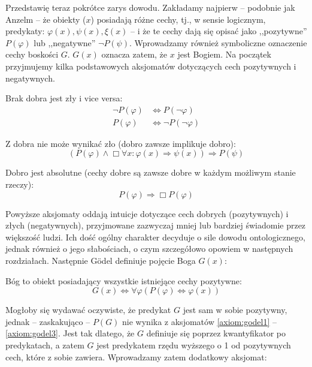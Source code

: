 \documentclass[12pt]{article}
\begin{document}
\begin{multicols}{2}
Przedstawię teraz pokrótce zarys dowodu. Zakładamy najpierw -- podobnie jak Anzelm -- że obiekty ($x$) posiadają różne cechy, tj., w sensie logicznym, predykaty: $\varphi(x), \psi(x), \xi(x)$ -- i że te cechy dają się opisać jako ,,pozytywne'' $P(\varphi)$ lub ,,negatywne'' $\neg P(\psi)$. Wprowadzamy również symboliczne oznaczenie cechy boskości $G$. $G(x)$ oznacza zatem, że $x$ jest Bogiem. Na początek przyjmujemy kilka podstawowych aksjomatów dotyczących cech pozytywnych i negatywnych. 
\begin{axiom-g} \label{axiom:godel1}
	Brak dobra jest zły i vice versa: 
	\begin{align*}
	\neg P(\varphi) & \Leftrightarrow P(\neg \varphi) \\ 
	P(\varphi) & \Leftrightarrow \neg P( \neg \varphi )
	\end{align*}
\end{axiom-g}
\begin{axiom-g} \label{axiom:godel2}
	Z dobra nie może wynikać zło (dobro zawsze implikuje dobro): 
	\begin{equation*}
	\left( P(\varphi) \wedge \Box \forall x: \varphi(x) \Rightarrow \psi(x) \right) \Rightarrow P(\psi)
	\end{equation*}
\end{axiom-g}
\begin{axiom-g} \label{axiom:godel3}
	Dobro jest absolutne (cechy dobre są zawsze dobre w każdym możliwym stanie rzeczy):
	\begin{equation*}
	P(\varphi) \Rightarrow \Box P(\varphi)
	\end{equation*}
\end{axiom-g}
Powyższe aksjomaty oddają intuicje dotyczące cech dobrych (pozytywnych) i złych (negatywnych), przyjmowane zazwyczaj mniej lub bardziej świadomie przez większość ludzi. Ich dość ogólny charakter decyduje o sile dowodu ontologicznego, jednak również o jego słabościach, o czym szczegółowo opowiem w następnych rozdziałach. 
Następnie Gödel definiuje pojęcie Boga $G(x)$:
\begin{definition-g} \label{def:godel1}
	Bóg to obiekt posiadający wszystkie istniejące cechy pozytywne: 
	\begin{equation*}
	G(x) \Leftrightarrow \forall \varphi \left( P(\varphi) \Leftrightarrow \varphi(x) \right)
	\end{equation*}
\end{definition-g}
Mogłoby się wydawać oczywiste, że predykat $G$ jest sam w sobie pozytywny, jednak -- zaskakująco -- $P(G)$ nie wynika z aksjomatów \ref{axiom:godel1} -- \ref{axiom:godel3}. Jest tak dlatego, że $G$ definiuje się poprzez kwantyfikator po predykatach, a zatem $G$ jest predykatem rzędu wyższego o 1 od pozytywnych cech, które z sobie zawiera. Wprowadzamy zatem dodatkowy aksjomat:

\end{multicols}
\end{document}
